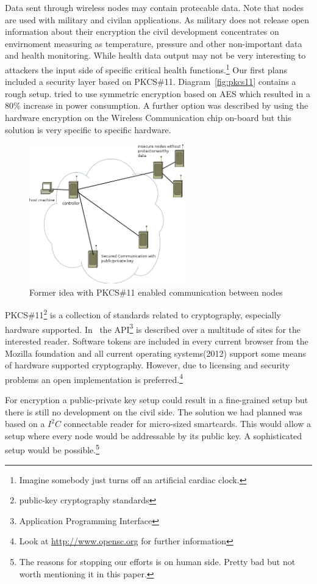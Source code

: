 Data sent through wireless nodes may contain protecable data. Note that nodes are used with military and civilan applications. As military does
not release open information about their encryption the civil development concentrates on envirnoment measuring as temperature, pressure and other 
non-important data and health monitoring.\cite{Dispert}
While health data output may not be very interesting to attackers the input side of specific critical health functions.\footnote{Imagine somebody 
just turns off an artificial cardiac clock.}
Our first plans included a security layer based on \textsc{PKCS\#11}. Diagram~\ref{fig:pkcs11} contains a rough setup. \cite{wsnsec} tried to 
use symmetric encryption based on \textsc{AES} which resulted in a 80\% increase in power consumption. A further option was described by 
using the hardware encryption on the Wireless Communication chip on-board but this solution is very specific to specific hardware.

\begin{figure}[h]
   \centering
   \includegraphics[width=0.6\textwidth]{pic/pkcs11.png}%
   \caption{Former idea with PKCS\#11 enabled communication between nodes}
   \label{pkcs11}%
\end{figure}


\textsc{PKCS\#11}\footnote{public-key cryptography standards} is a collection of standards related to cryptography, especially hardware supported.
In~\cite{PKCS_RSA} the API\footnote{Application Programming Interface} is described over a multitude of sites for the interested reader.
Software tokens are included in every current browser from the Mozilla foundation and all current operating systems(2012) support some means of 
hardware supported cryptography. However, due to licensing and security problems an open implementation is preferred.\footnote{Look at \url{http://www.opensc.org} for further information}

For encryption a public-private key setup could result in a fine-grained setup but there is still no development on the civil side.
The solution we had planned was based on a \(I^2C\) connectable reader for micro-sized smartcards. This would allow a setup where every node
would be addressable by its public key. A sophisticated setup would be possible.\footnote{The reasons for stopping our efforts is on human side. Pretty
bad but not worth mentioning it in this paper.}

